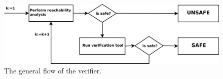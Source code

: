 \begin{figure}
\includegraphics[width=400pt] {bilder/flowchart.png}
\caption{The general flow of the verifier.}
\label{flow}
\end{figure}
